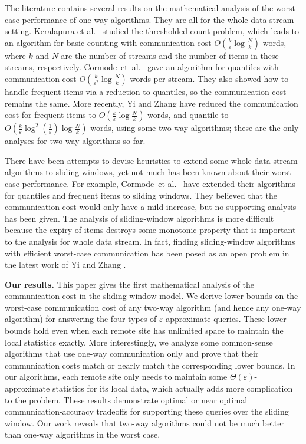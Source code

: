 \documentclass[proceedings]{stacs}
\theoremstyle{definition}\newtheorem{fact}{Fact}
\begin{document}
The literature contains several results on the
mathematical analysis of the worst-case
performance of one-way algorithms.
They are all for the whole data stream setting.
Keralapura et al.\ \cite{KeralapuraCR06}
studied the thresholded-count problem, which leads to
an algorithm for basic counting with communication cost
$O(\frac{k}{\varepsilon}\log \frac{N}{k})$ words, where $k$ and
$N$ are the number of streams and the
number of items in these streams, respectively.
Cormode~et~al.\ \cite{CormodeGMR05} gave an algorithm for
quantiles with communication cost $O(\frac{k}{\varepsilon^2} \log
\frac{N}{k})$ words per stream.
They also showed how to handle frequent items via
a reduction to quantiles,
so the communication cost remains the same.
More recently,  Yi and Zhang \cite{YiZ08} have reduced
the communication cost for frequent items
to $O(\frac{k}{\varepsilon} \log \frac{N}{k})$ words,
and quantile to $O(\frac{k}{\varepsilon} \log^2 (\frac{1}{\varepsilon})
\log \frac{N}{k})$ words, using some two-way algorithms; these are the
only analyses for two-way algorithms so far.

There have been attempts to devise heuristics
to extend some whole-data-stream algorithms to
sliding windows, yet not much has been known about
their worst-case performance.
For example, Cormode~et al.\ \cite{CormodeGMR05} have
extended their algorithms for quantiles and frequent items
to sliding windows.
They believed that the communication cost would only have
a mild increase,
but no supporting analysis has been given.  The
analysis of sliding-window algorithms is more difficult because
the expiry of items destroys some monotonic
property that is important to the analysis for
whole data stream.
In fact,
finding sliding-window algorithms with efficient worst-case
communication has been posed as an open problem
in the latest work of Yi and Zhang \cite{YiZ08}.

\vspace{0.5ex}
{\bf Our results.}
This paper gives the first mathematical analysis of
the communication cost in the sliding window model.
We derive
lower bounds on the worst-case communication cost
of any two-way
algorithm (and hence any one-way algorithm) for answering the four types
of $\varepsilon$-approximate queries.
These lower bounds hold even when each remote site
has unlimited space to maintain the local statistics exactly.
More interestingly, we analyze
some common-sense algorithms that use one-way communication only
and prove that their communication costs
match or nearly match the corresponding lower bounds.
In our algorithms, each remote site only needs to
maintain some $\Theta(\varepsilon)$-approximate statistics for its local data,
which actually adds more complication
to the problem.
These results demonstrate optimal or near optimal
communication-accuracy tradeoffs for supporting these queries
over the sliding window.
Our work reveals that
two-way algorithms could not
be much better than one-way algorithms in the worst case.
\end{document}

